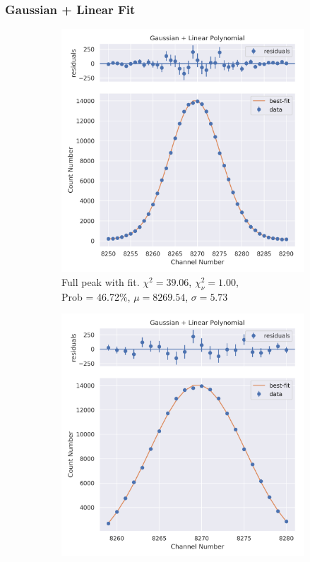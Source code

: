 \documentclass[11pt,a4paper]{article}
\begin{document}
\subsubsection{Gaussian + Linear Fit}
\begin{figure}[H]
  \centering
  \begin{subfigure}{.5\linewidth}
    \centering
    \includegraphics[width=\linewidth]{./Images/Cobalt60/Linear/Linear_1_Full.png}
    \caption{Full peak with fit. $\chi^2 = 39.06$, $\chi^2_\nu = 1.00$, \\ Prob = 46.72\%, $\mu = 8269.54$, $\sigma = 5.73$}
  \end{subfigure}%
  \begin{subfigure}{.5\linewidth}
    \centering
    \includegraphics[width=\linewidth]{./Images/Cobalt60/Linear/Linear_1_Zoom.png}

\end{subfigure}
\end{figure}
\end{document}
